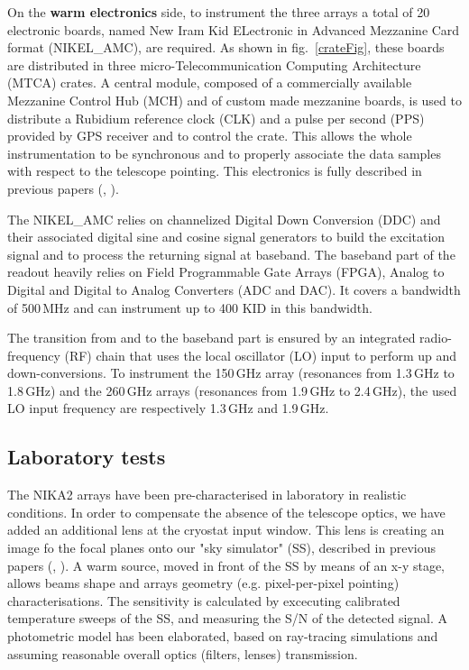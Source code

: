\documentclass[]{aa} %
\begin{document}
On the {\bf{warm electronics}} side, to instrument the three arrays a total of 20 electronic boards, named New Iram Kid ELectronic in Advanced Mezzanine Card format (NIKEL\_AMC), are required.
As shown in fig.~\ref{crateFig}, these boards are distributed in three micro-Telecommunication Computing Architecture (MTCA) crates.
A central module, composed of a commercially available Mezzanine Control Hub (MCH) and of custom made mezzanine boards, is used to distribute a Rubidium reference clock (CLK) and a pulse per second (PPS) provided by GPS receiver and to control the crate.
This allows the whole instrumentation to be synchronous and to properly associate the data 
samples with respect to the telescope pointing.
This electronics is fully described in previous papers (\cite{Bourrion2012}, \cite{Bourrion2016}).

%
The NIKEL\_AMC relies on channelized Digital Down Conversion (DDC) and their associated digital sine and cosine signal generators to build the excitation signal and to process the returning signal at baseband.
The baseband part of the readout heavily relies on Field Programmable Gate Arrays (FPGA), Analog to Digital and Digital to Analog Converters (ADC and DAC).
It covers a bandwidth of 500\,MHz and can instrument up to 400 KID in this bandwidth.

The transition from and to the baseband part is ensured by an integrated radio-frequency (RF) chain that uses the local oscillator (LO) input to perform up and down-conversions.
To instrument the 150\,GHz array (resonances from 1.3\,GHz to 1.8\,GHz) and the 260\,GHz arrays (resonances from 1.9\,GHz to 2.4\,GHz), the used LO input frequency are respectively 1.3\,GHz and 1.9\,GHz.


\subsection{Laboratory tests}
\label{Laboratory tests}

The NIKA2 arrays have been pre-characterised in laboratory in realistic conditions. In order to compensate the absence of the telescope optics, we have added an additional lens at the cryostat input window. This lens is creating an image fo the focal planes onto our "sky simulator" (SS), described in previous papers (\cite{Catalano2014}, \cite{Monfardini2011}). A warm source, moved in front of the SS by means of an x-y stage, allows beams shape and arrays geometry (e.g. pixel-per-pixel pointing) characterisations. The sensitivity is calculated by excecuting calibrated temperature sweeps of the SS, and measuring the S/N of the detected signal. A photometric model has been elaborated, based on ray-tracing simulations and assuming reasonable overall optics (filters, lenses) transmission. 
\end{document}
